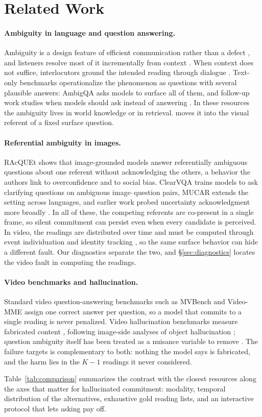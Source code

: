 \section{Related Work}

\paragraph{Ambiguity in language and question answering.} Ambiguity is a design feature of efficient communication rather than a defect \citep{piantadosi2012communicative}, and listeners resolve most of it incrementally from context \citep{ferreira2008ambiguity, sedivy1999achieving}. When context does not suffice, interlocutors ground the intended reading through dialogue \citep{clark1991grounding, clark1996using}. Text-only benchmarks operationalize the phenomenon as questions with several plausible answers: AmbigQA \citep{min2020ambigqa} asks models to surface all of them, and follow-up work studies when models should ask instead of answering \citep{stengeleskin2023chicken}. In these resources the ambiguity lives in world knowledge or in retrieval. \bench{} moves it into the visual referent of a fixed surface question.

\paragraph{Referential ambiguity in images.} RAcQUEt \citep{testoni2025racquet} shows that image-grounded models answer referentially ambiguous questions about one referent without acknowledging the others, a behavior the authors link to overconfidence and to social bias. ClearVQA \citep{jian2025clearvqa} trains models to ask clarifying questions on ambiguous image--question pairs, MUCAR \citep{wang2025mucar} extends the setting across languages, and earlier work probed uncertainty acknowledgment more broadly \citep{liu2023afraid, pezzelle2023dealing}. In all of these, the competing referents are co-present in a single frame, so silent commitment can persist even when every candidate is perceived. In video, the readings are distributed over time and must be computed through event individuation and identity tracking \citep{zacks2007event}, so the same surface behavior can hide a different fault. Our diagnostics separate the two, and \S\ref{sec:diagnostics} locates the video fault in computing the readings.

\paragraph{Video benchmarks and hallucination.} Standard video question-answering benchmarks such as MVBench \citep{li2024mvbench} and Video-MME \citep{fu2024videomme} assign one correct answer per question, so a model that commits to a single reading is never penalized. Video hallucination benchmarks measure fabricated content \citep{liu2025vidhalluc, choong2025vidhal}, following image-side analyses of object hallucination \citep{rohrbach2018object}; question ambiguity itself has been treated as a nuisance variable to remove \citep{bhattacharya2019why}. The failure \bench{} targets is complementary to both: nothing the model says is fabricated, and the harm lies in the $K-1$ readings it never considered.

Table~\ref{tab:comparison} summarizes the contrast with the closest resources along the axes that matter for hallucinated commitment: modality, temporal distribution of the alternatives, exhaustive gold reading lists, and an interactive protocol that lets asking pay off.
